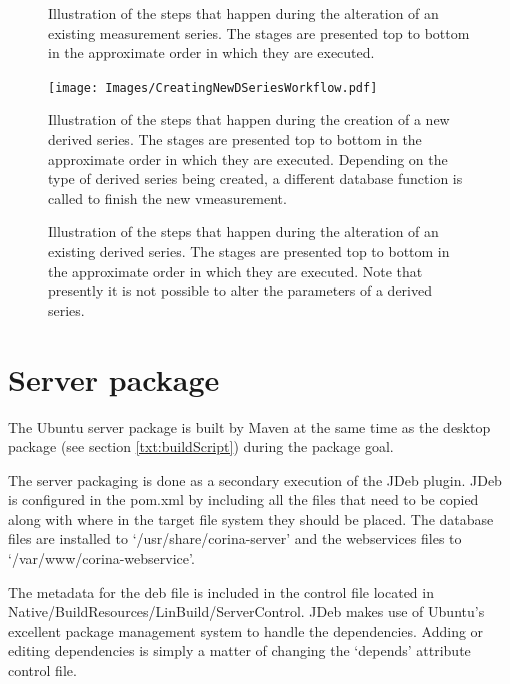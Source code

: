 \begin{figure}[hbtp]
  \centering
  \caption{Illustration of the steps that happen during the alteration of an existing measurement series. The stages are presented top to bottom in the approximate order in which they are executed.}
  \label{fig:editingNewMSeries}
\end{figure}

\begin{figure}[hbtp]
  \centering
  \texttt{[image: Images/CreatingNewDSeriesWorkflow.pdf]}
  \caption{Illustration of the steps that happen during the creation of a new derived series. The stages are presented top to bottom in the approximate order in which they are executed.  Depending on the type of derived series being created, a different database function is called to finish the new vmeasurement.}
  \label{fig:creatingNewMSeries}
\end{figure}

\begin{figure}[hbtp]
  \centering
  \caption{Illustration of the steps that happen during the alteration of an existing derived series. The stages are presented top to bottom in the approximate order in which they are executed. Note that presently it is not possible to alter the parameters of a derived series.}
  \label{fig:editingNewMSeries}
\end{figure}



\section{Server package}
\label{txt:serverPackage}
The Ubuntu server package is built by Maven at the same time as the desktop package (see section \ref{txt:buildScript}) during the package goal.  

The server packaging is done as a secondary execution of the JDeb plugin.  JDeb is configured in the pom.xml by including all the files that need to be copied along with where in the target file system they should be placed. The database files are installed to `/usr/share/corina-server' and the webservices files to `/var/www/corina-webservice'. 

The metadata for the deb file is included in the control file located in Native/BuildResources/LinBuild/ServerControl.  JDeb makes use of Ubuntu's excellent package management system to handle the dependencies.  Adding or editing dependencies is simply a matter of changing the `depends' attribute control file.  

